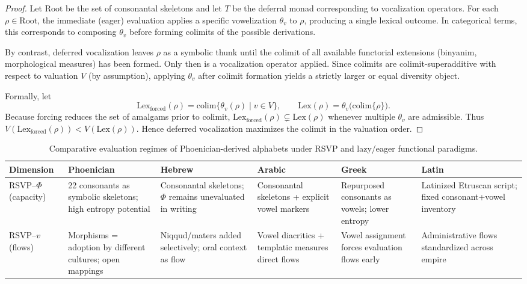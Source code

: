 \documentclass[12pt]{article}
\theoremstyle{remark}
\begin{document}
\begin{proof}
Let $\mathrm{Root}$ be the set of consonantal skeletons and let $T$ be the deferral monad corresponding to vocalization operators. For each $\rho \in \mathrm{Root}$, the immediate (eager) evaluation applies a specific vowelization $\theta_v$ to $\rho$, producing a single lexical outcome. In categorical terms, this corresponds to composing $\theta_v$ before forming colimits of the possible derivations.

By contrast, deferred vocalization leaves $\rho$ as a symbolic thunk until the colimit of all available functorial extensions (binyanim, morphological measures) has been formed. Only then is a vocalization operator applied. Since colimits are colimit-superadditive with respect to valuation $V$ (by assumption), applying $\theta_v$ after colimit formation yields a strictly larger or equal diversity object.

Formally, let
\[
\mathrm{Lex}_{\mathrm{forced}}(\rho) = \mathrm{colim}\{\theta_v(\rho) \mid v \in V\}, \qquad 
\mathrm{Lex}(\rho) = \theta_v\Big(\mathrm{colim}\{\rho\}\Big).
\]
Because forcing reduces the set of amalgams prior to colimit, $\mathrm{Lex}_{\mathrm{forced}}(\rho) \subsetneq \mathrm{Lex}(\rho)$ whenever multiple $\theta_v$ are admissible. Thus $V(\mathrm{Lex}_{\mathrm{forced}}(\rho)) < V(\mathrm{Lex}(\rho))$. Hence deferred vocalization maximizes the colimit in the valuation order.
\end{proof}


\begin{table}[h!]
\centering
\renewcommand{\arraystretch}{1.4}
\begin{tabularx}{\textwidth}{l X X X X X}
\toprule
Dimension & Phoenician & Hebrew & Arabic & Greek & Latin \\
\midrule
RSVP--$\Phi$ (capacity) & 22 consonants as symbolic skeletons; high entropy potential 
& Consonantal skeletons; $\Phi$ remains unevaluated in writing 
& Consonantal skeletons + explicit vowel markers 
& Repurposed consonants as vowels; lower entropy 
& Latinized Etruscan script; fixed consonant+vowel inventory \\
RSVP--$v$ (flows) & Morphisms = adoption by different cultures; open mappings 
& Niqqud/maters added selectively; oral context as flow 
& Vowel diacritics + templatic measures direct flows 
& Vowel assignment forces evaluation flows early 
& Administrative flows standardized across empire \\
\bottomrule
\end{tabularx}
\caption{Comparative evaluation regimes of Phoenician-derived alphabets under RSVP and lazy/eager functional paradigms.}
\end{table}
\end{document}
